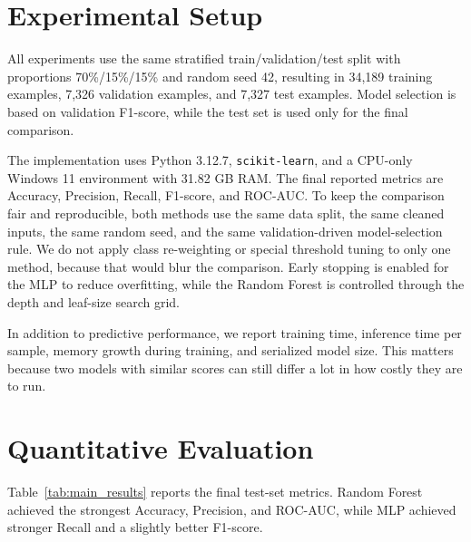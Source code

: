 \documentclass[10pt,twocolumn,letterpaper]{article}
\begin{document}
\section{Experimental Setup}
All experiments use the same stratified train/validation/test split with proportions 70\%/15\%/15\% and random seed 42, resulting in 34,189 training examples, 7,326 validation examples, and 7,327 test examples. Model selection is based on validation F1-score, while the test set is used only for the final comparison.

The implementation uses Python 3.12.7, \texttt{scikit-learn}, and a CPU-only Windows 11 environment with 31.82 GB RAM. The final reported metrics are Accuracy, Precision, Recall, F1-score, and ROC-AUC. To keep the comparison fair and reproducible, both methods use the same data split, the same cleaned inputs, the same random seed, and the same validation-driven model-selection rule. We do not apply class re-weighting or special threshold tuning to only one method, because that would blur the comparison. Early stopping is enabled for the MLP to reduce overfitting, while the Random Forest is controlled through the depth and leaf-size search grid.

In addition to predictive performance, we report training time, inference time per sample, memory growth during training, and serialized model size. This matters because two models with similar scores can still differ a lot in how costly they are to run.

\section{Quantitative Evaluation}
Table~\ref{tab:main_results} reports the final test-set metrics. Random Forest achieved the strongest Accuracy, Precision, and ROC-AUC, while MLP achieved stronger Recall and a slightly better F1-score.

\begin{table}[t]
\centering
\caption{Test-set classification metrics for the two compared models.}
\label{tab:main_results}
\scriptsize
\setlength{\tabcolsep}{3.5pt}
\end{table}
\end{document}
